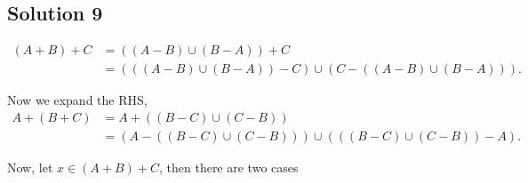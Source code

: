 \subsection{Solution 9}

  \begin{align*}
    \left(A + B  \right) + C &= \left( \left( A - B \right) \cup \left( B - A \right) \right) + C \\
    &= \left( \left( \left( A - B \right) \cup \left( B - A \right) \right) - C \right) \cup \left( C - \left( \left( A - B  \right) \cup \left( B- A \right) \right) \right)
  .\end{align*}

  Now we expand the RHS,
  \begin{align*}
    A + \left( B + C \right) &= A + \left( \left( B - C \right) \cup  \left( C - B \right) \right) \\
    &= \left( A - \left( \left( B - C \right) \cup  \left( C - B \right) \right) \right) \cup \left( \left( \left( B - C \right) \cup  \left( C - B \right) \right) - A \right)
  .\end{align*}

  Now, let \( x \in \left( A + B \right) + C \), then there are two cases 

